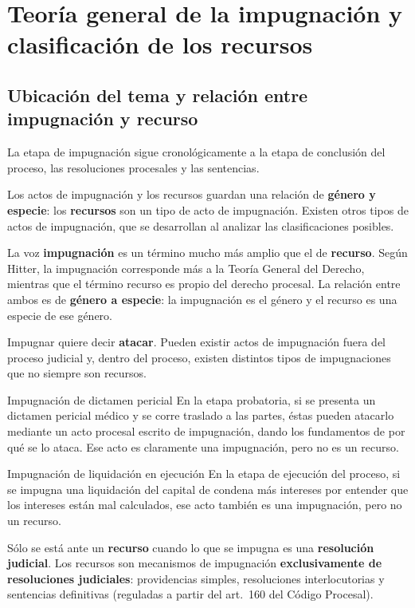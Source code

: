 \documentclass[12pt,oneside]{book}
\begin{document}
\chapter[Teoría general de la impugnación]{Teoría general de la impugnación y clasificación de los recursos}\label{cap:impugnacion}

\section{Ubicación del tema y relación entre impugnación y recurso}

La etapa de impugnación sigue cronológicamente a la etapa de conclusión del proceso, las resoluciones procesales y las sentencias.

Los actos de impugnación y los recursos guardan una relación de \textbf{género y especie}: los \textbf{recursos} son un tipo de acto de impugnación. Existen otros tipos de actos de impugnación, que se desarrollan al analizar las clasificaciones posibles.

La voz \textbf{impugnación} es un término mucho más amplio que el de \textbf{recurso}. Según Hitter, la impugnación corresponde más a la Teoría General del Derecho, mientras que el término recurso es propio del derecho procesal. La relación entre ambos es de \textbf{género a especie}: la impugnación es el género y el recurso es una especie de ese género.

Impugnar quiere decir \textbf{atacar}. Pueden existir actos de impugnación fuera del proceso judicial y, dentro del proceso, existen distintos tipos de impugnaciones que no siempre son recursos.

\begin{example}{Impugnación de dictamen pericial}
En la etapa probatoria, si se presenta un dictamen pericial médico y se corre traslado a las partes, éstas pueden atacarlo mediante un acto procesal escrito de impugnación, dando los fundamentos de por qué se lo ataca. Ese acto es claramente una impugnación, pero no es un recurso.
\end{example}

\begin{example}{Impugnación de liquidación en ejecución}
En la etapa de ejecución del proceso, si se impugna una liquidación del capital de condena más intereses por entender que los intereses están mal calculados, ese acto también es una impugnación, pero no un recurso.
\end{example}

\begin{important}
Sólo se está ante un \textbf{recurso} cuando lo que se impugna es una \textbf{resolución judicial}. Los recursos son mecanismos de impugnación \textbf{exclusivamente de resoluciones judiciales}: providencias simples, resoluciones interlocutorias y sentencias definitivas (reguladas a partir del art.~160 del Código Procesal).
\end{important}
\end{document}
